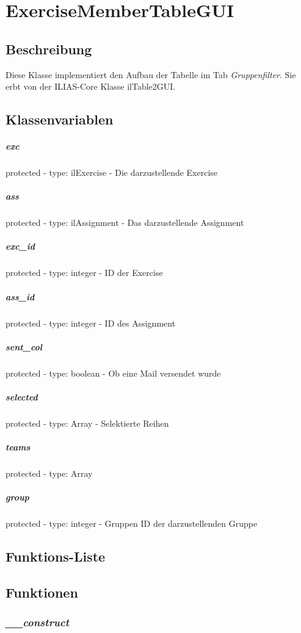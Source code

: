 \section{ExerciseMemberTableGUI}

\subsection*{Beschreibung}
Diese Klasse implementiert den Aufbau der Tabelle im Tab \textit{Gruppenfilter}. 
Sie erbt von der ILIAS-Core Klasse ilTable2GUI.

\subsection*{Klassenvariablen}
\subparagraph{exc}
protected - type: ilExercise - Die darzustellende Exercise
\subparagraph{ass}
protected - type: ilAssignment - Das darzustellende Assignment
\subparagraph{exc\_id}
protected - type: integer - ID der Exercise
\subparagraph{ass\_id}
protected - type: integer - ID des Assignment
\subparagraph{sent\_col}
protected - type: boolean - Ob eine Mail versendet wurde
\subparagraph{selected}
protected - type: Array - Selektierte Reihen
\subparagraph{teams}
protected - type: Array
\subparagraph{group}
protected - type: integer - Gruppen ID der darzustellenden Gruppe


\subsection*{Funktions-Liste}

\subparagraph{}
\subparagraph{}
\subparagraph{}
\subparagraph{}

\subsection*{Funktionen}

\subsubsection*{\textit{\_\_construct}}\label{__constructTable}


